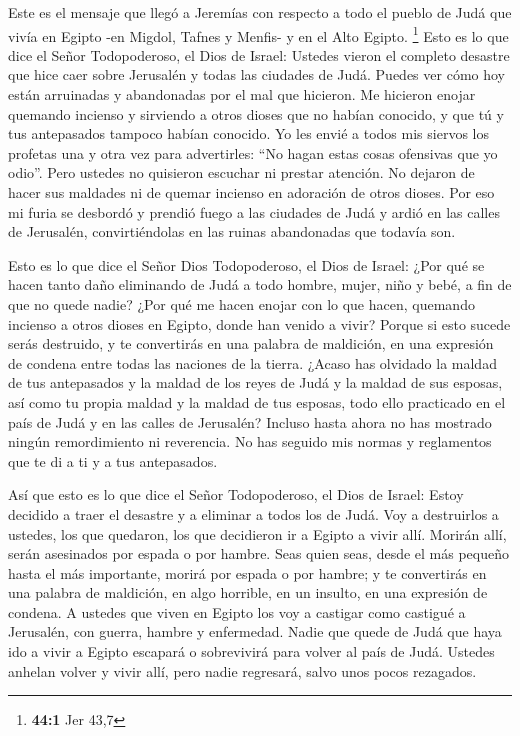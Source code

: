  Este es el mensaje que llegó a Jeremías con respecto a
todo el pueblo de Judá que vivía en Egipto -en Migdol, Tafnes y Menfis-
y en el Alto Egipto. \footnote{\textbf{44:1} Jer 43,7} 
Esto es lo que dice el Señor Todopoderoso, el Dios de Israel: Ustedes
vieron el completo desastre que hice caer sobre Jerusalén y todas las
ciudades de Judá. Puedes ver cómo hoy están arruinadas y abandonadas
 por el mal que hicieron. Me hicieron enojar quemando
incienso y sirviendo a otros dioses que no habían conocido, y que tú y
tus antepasados tampoco habían conocido.  Yo les envié a
todos mis siervos los profetas una y otra vez para advertirles: ``No
hagan estas cosas ofensivas que yo odio''.  Pero ustedes
no quisieron escuchar ni prestar atención. No dejaron de hacer sus
maldades ni de quemar incienso en adoración de otros dioses.
 Por eso mi furia se desbordó y prendió fuego a las
ciudades de Judá y ardió en las calles de Jerusalén, convirtiéndolas en
las ruinas abandonadas que todavía son.

 Esto es lo que dice el Señor Dios Todopoderoso, el Dios
de Israel: ¿Por qué se hacen tanto daño eliminando de Judá a todo
hombre, mujer, niño y bebé, a fin de que no quede nadie? 
¿Por qué me hacen enojar con lo que hacen, quemando incienso a otros
dioses en Egipto, donde han venido a vivir? Porque si esto sucede serás
destruido, y te convertirás en una palabra de maldición, en una
expresión de condena entre todas las naciones de la tierra.
 ¿Acaso has olvidado la maldad de tus antepasados y la
maldad de los reyes de Judá y la maldad de sus esposas, así como tu
propia maldad y la maldad de tus esposas, todo ello practicado en el
país de Judá y en las calles de Jerusalén?  Incluso hasta
ahora no has mostrado ningún remordimiento ni reverencia. No has seguido
mis normas y reglamentos que te di a ti y a tus antepasados.

 Así que esto es lo que dice el Señor Todopoderoso, el
Dios de Israel: Estoy decidido a traer el desastre y a eliminar a todos
los de Judá.  Voy a destruirlos a ustedes, los que
quedaron, los que decidieron ir a Egipto a vivir allí. Morirán allí,
serán asesinados por espada o por hambre. Seas quien seas, desde el más
pequeño hasta el más importante, morirá por espada o por hambre; y te
convertirás en una palabra de maldición, en algo horrible, en un
insulto, en una expresión de condena.  A ustedes que
viven en Egipto los voy a castigar como castigué a Jerusalén, con
guerra, hambre y enfermedad.  Nadie que quede de Judá que
haya ido a vivir a Egipto escapará o sobrevivirá para volver al país de
Judá. Ustedes anhelan volver y vivir allí, pero nadie regresará, salvo
unos pocos rezagados.

